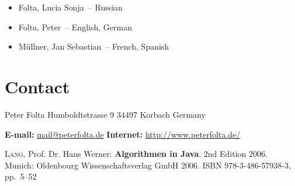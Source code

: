 \documentclass[11pt, a4paper, titlepage, twoside]{article}
\renewcommand{\emph}{\textbf}
\begin{document}
	\begin{itemize}
		\singlespacing
		\item{Folta, Lucia Sonja~-- Russian}
		\item{Folta, Peter~-- English, German}
		\item{Müllner, Jan Sebastian~-- French, Spanish}
	\end{itemize}
	
	\section{Contact}
	
	\noindent{}Peter Folta\newline{}
	Humboldtstrasse 9\newline{}
	34497 Korbach\newline{}
	Germany\newline{}
	
	\noindent{}\textbf{E-mail:} \href{mailto:mail@peterfolta.de}{mail@peterfolta.de}\newline{}
	\textbf{Internet:} \href{http://www.peterfolta.de/}{http://www.peterfolta.de/}
	
	\begin{thebibliography}{99}
			\textsc{Lang}, Prof. Dr. Hans Werner: \emph{Algorithmen in Java}. 2nd Edition 2006. Munich: Oldenbourg Wissenschaftsverlag GmbH 2006. ISBN 978-3-486-57938-3, pp.~5--52
		\end{thebibliography}
	
	\listoffigures{}
	\lstlistoflistings{}
\end{document}
